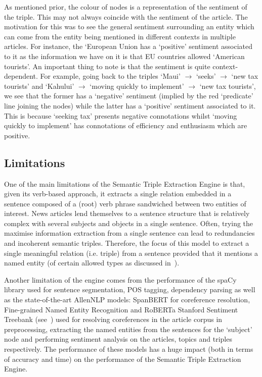 As mentioned prior, the colour of nodes is a representation of the sentiment of the triple. This may not always coincide with the sentiment of the article. The motivation for this was to see the general sentiment surrounding an entity which can come from the entity being mentioned in different contexts in multiple articles. For instance, the `European Union has a `positive' sentiment associated to it as the information we have on it is that EU countries allowed `American tourists'. An important thing to note is that the sentiment is quite context-dependent. For example, going back to the triples `Maui' $\rightarrow$ `seeks'  $\rightarrow$ `new tax tourists' and `Kahului' $\rightarrow$ `moving quickly to implement' $\rightarrow$ `new tax tourists', we see that the former has a `negative' sentiment (implied by the red `predicate' line joining the nodes) while the latter has a `positive' sentiment associated to it. This is because `seeking tax' presents negative connotations whilst `moving quickly to implement' has connotations of efficiency and enthusiasm which are positive.


\subsection*{Limitations}

One of the main limitations of the Semantic Triple Extraction Engine is that, given its verb-based approach, it extracts a single relation embedded in a sentence composed of a (root) verb phrase sandwiched between two entities of interest. 
News articles lend themselves to a sentence structure that is relatively complex with several subjects and objects in a single sentence. Often, trying the maximise information extraction from a single sentence can lead to redundancies and incoherent semantic triples. Therefore, the focus of this model to extract a single meaningful relation (i.e. triple) from a sentence provided that it mentions a named entity (of certain allowed types as discussed in~). 

Another limitation of the engine comes from the performance of the spaCy library used for sentence segmentation, POS tagging, dependency parsing as well as the state-of-the-art AllenNLP models: SpanBERT for coreference resolution, Fine-grained Named Entity Recognition and RoBERTa Stanford Sentiment Treebank (see~) used for resolving coreferences in the article corpus in preprocessing, extracting the named entities from the sentences for the `subject' node and performing sentiment analysis on the articles, topics and triples respectively. The performance of these models has a huge impact (both in terms of accuracy and time) on the performance of the Semantic Triple Extraction Engine. 

